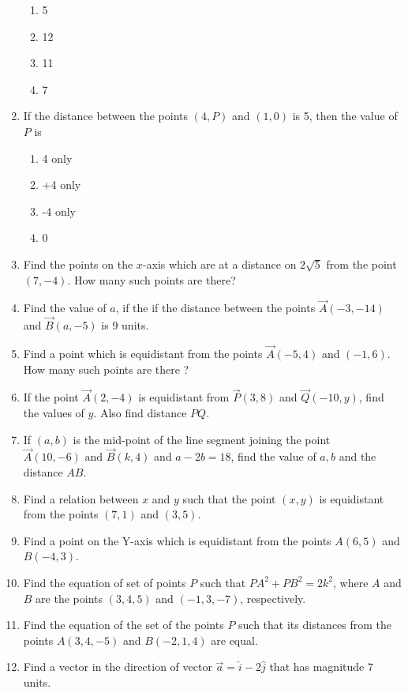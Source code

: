 \begin{enumerate}[label=\thesubsection.\arabic*, ref=\thesubsection.\theenumi]
\begin{enumerate}
\item 5
\item 12
\item 11
\item 7
\end{enumerate}
\item If the distance between the points $(4, P)$  and $ (1, 0)$ is 5, then the value of ${P}$ is
\begin{enumerate}                       
\item4 only
\item+4 only
\item-4 only
\item0
\end{enumerate}
\item Find the points on the $x$-axis which are at a distance on $2\sqrt{5}$ from the point $ (7, -4).$ How many such points are there?
\item Find the value of $a$,  if the if the distance between the points $\vec{A}(-3, -14)$  and $\vec{B}(a, -5)$ is 9 units.
\item Find a point which is equidistant from the points $\vec{A}(-5, 4)$  and $(-1, 6)$.  How many such points are there ?
\item If the point $\vec{A}(2, -4)$ is equidistant from $\vec{P}(3, 8)$  and $\vec{Q}(-10, y)$,  find the values of $y$.  Also find distance $PQ$.
\item If $(a, b)$ is the mid-point of the line segment joining the point $\vec{A}(10, -6)\text{ and }\vec{B}(k, 4)$ and $a-2b=18$,  find the value of $a, b$ and the distance $AB$.
\item Find a relation between $x$ and $y$ such that the point $(x,y)$ is equidistant from the points $(7,1)$ and $(3,5)$.
\item Find a point on the Y-axis which is equidistant from the points $A(6,5)$ and $B(-4,3)$.
\item Find the equation of set of points $P$ such that $PA^2+PB^2=2k^2$, where $A$ and $B$ are the points $(3,4,5)$ and $(-1,3,-7)$, respectively.
\item Find the equation of the set of the points $P$ such that its distances from the points $A(3,4,-5)$ and $B(-2,1,4)$ are equal.
\item Find a vector in the direction of vector $\overrightarrow{a}=\hat{i} -2\hat{j}$ that has magnitude $7$ units.
\end{enumerate}
